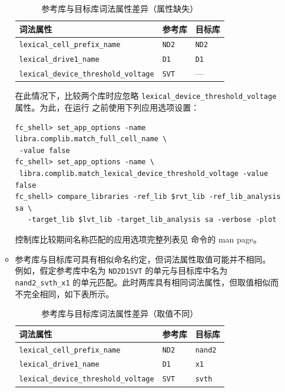 \begin{enumerate}
\begin{itemize}
\begin{table}[htbp]
\centering
\caption{参考库与目标库词法属性差异（属性缺失）}
\label{tab:fc-lex-diff-missing}
\begin{tabularx}{\textwidth}{@{}X l l@{}}
\toprule
\textbf{词法属性} & \textbf{参考库} & \textbf{目标库} \\
\midrule
\texttt{lexical\_cell\_prefix\_name} & \texttt{ND2} & \texttt{ND2} \\
\texttt{lexical\_drive1\_name} & \texttt{D1} & \texttt{D1} \\
\texttt{lexical\_device\_threshold\_voltage} & \texttt{SVT} & --- \\
\bottomrule
\end{tabularx}
\end{table}

        在此情况下，比较两个库时应忽略 \texttt{lexical\_device\_threshold\_voltage} 属性。为此，在运行  之前使用下列应用选项设置：
\begin{lstlisting}
fc_shell> set_app_options -name libra.complib.match_full_cell_name \
 -value false
fc_shell> set_app_options -name \
 libra.complib.match_lexical_device_threshold_voltage -value false
fc_shell> compare_libraries -ref_lib $rvt_lib -ref_lib_analysis sa \
   -target_lib $lvt_lib -target_lib_analysis sa -verbose -plot
\end{lstlisting}

\begin{noteBox}
控制库比较期间名称匹配的应用选项完整列表见  命令的 man page。
\end{noteBox}

      \item 参考库与目标库可具有相似命名约定，但词法属性取值可能并不相同。\\
        例如，假定参考库中名为 \texttt{ND2D1SVT} 的单元与目标库中名为 \texttt{nand2\_svth\_x1} 的单元匹配。此时两库具有相同词法属性，但取值相似而不完全相同，如下表所示。

\begin{table}[htbp]
\centering
\caption{参考库与目标库词法属性差异（取值不同）}
\label{tab:fc-lex-diff-values}
\begin{tabularx}{\textwidth}{@{}X l l@{}}
\toprule
\textbf{词法属性} & \textbf{参考库} & \textbf{目标库} \\
\midrule
\texttt{lexical\_cell\_prefix\_name} & \texttt{ND2} & \texttt{nand2} \\
\texttt{lexical\_drive1\_name} & \texttt{D1} & \texttt{x1} \\
\texttt{lexical\_device\_threshold\_voltage} & \texttt{SVT} & \texttt{svth} \\
\bottomrule
\end{tabularx}
\end{table}


\end{itemize}
\end{enumerate}
